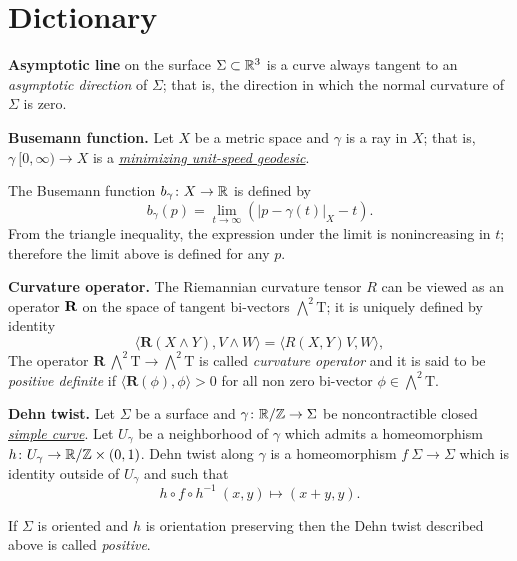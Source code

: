 \chapter{Dictionary}

\begin{description}

\item{\bf Asymptotic line}\label{Asymptotic line} on the surface $\Sigma\subset \mathbb{R}^3$
is a curve always tangent to an \emph{asymptotic direction} of $\Sigma$; 
that is, the direction in which the normal curvature of $\Sigma$ is zero.

\item{\bf Busemann function.}\label{Busemann function} 
Let $X$ be a metric space
and $\gamma$ is a ray in $X$; 
that is, $\gamma\:[0, \infty)\to X$ is a \hyperref[Geodesic]{\emph{minimizing unit-speed geodesic}}.

The Busemann function $b_\gamma\colon X\to\mathbb{R}$ is defined by
$$b_\gamma(p)=\lim_{t\to\infty}\left(|p-\gamma(t)|_X-t\right).$$
From the triangle inequality, 
the expression under the limit is nonincreasing in $t$; 
therefore  the limit above is defined for any $p$.

\item{\bf Curvature operator.}\label{Curvature operator}
The Riemannian curvature tensor $R$
can be viewed as an operator $\text{\bf R}$ on the space of tangent bi-vectors $\bigwedge^2 \mathrm{T}$;
it is uniquely defined by identity
$$\langle\mathbf{R}(X\wedge Y),V\wedge W\rangle
=
\langle R(X,Y)V,W\rangle,$$
The operator $\mathbf{R}\:\bigwedge^2 \mathrm{T}\to \bigwedge^2 \mathrm{T}$ is called \emph{curvature operator} and it is said to be \emph{positive definite} if
$\langle\mathbf{R}(\phi),\phi\rangle>0$ for all non zero
bi-vector $\phi\in\bigwedge^2 \mathrm{T}$.

\item{\bf Dehn twist.}\label{Dehn twist}
Let $\Sigma$ be a surface and $\gamma\colon\mathbb{R}/\mathbb{Z}\to\Sigma$ be noncontractible closed \hyperref[Simple curve]{\emph{simple curve}}.
Let $U_\gamma$ be a neighborhood of $\gamma$ which admits a homeomorphism $h\colon U_\gamma\to \mathbb{R}/\mathbb{Z}\times (0,1)$.
Dehn twist along $\gamma$ is a homeomorphism $f\:\Sigma\to\Sigma$
which is identity outside of $U_\gamma$ and 
such that
$$h\circ f\circ h^{-1}\:(x,y)\mapsto(x+y,y).$$

If $\Sigma$ is oriented 
and $h$ is orientation preserving
then the Dehn twist described above is called \emph{positive}.


\end{description}
